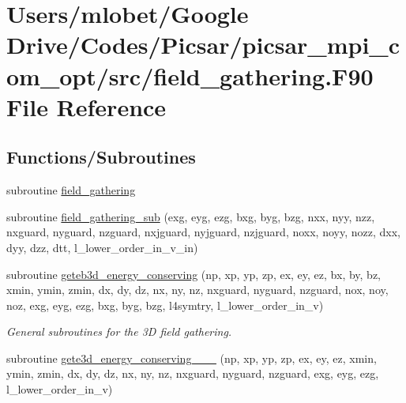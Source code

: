 \hypertarget{field__gathering_8_f90}{}\section{Users/mlobet/\+Google Drive/\+Codes/\+Picsar/picsar\+\_\+mpi\+\_\+com\+\_\+opt/src/field\+\_\+gathering.F90 File Reference}
\label{field__gathering_8_f90}
\subsection*{Functions/\+Subroutines}
\begin{DoxyCompactItemize}
\item 
subroutine \hyperlink{field__gathering_8_f90_a967586c463fd968e31a929a61e6e2b65}{field\+\_\+gathering}
\item 
subroutine \hyperlink{field__gathering_8_f90_a3048fd8eb5e48d87fa67d382d260b22f}{field\+\_\+gathering\+\_\+sub} (exg, eyg, ezg, bxg, byg, bzg, nxx, nyy, nzz, nxguard, nyguard, nzguard, nxjguard, nyjguard, nzjguard, noxx, noyy, nozz, dxx, dyy, dzz, dtt, l\+\_\+lower\+\_\+order\+\_\+in\+\_\+v\+\_\+in)
\item 
subroutine \hyperlink{field__gathering_8_f90_a97c6b6e6c658ab27a94491501be23409}{geteb3d\+\_\+energy\+\_\+conserving} (np, xp, yp, zp, ex, ey, ez, bx, by, bz, xmin, ymin, zmin, dx, dy, dz, nx, ny, nz, nxguard, nyguard, nzguard,                                                                                                                                                       nox, noy, noz, exg, eyg, ezg, bxg, byg, bzg, l4symtry, l\+\_\+lower\+\_\+order\+\_\+in\+\_\+v)
\begin{DoxyCompactList}\small\item\em General subroutines for the 3D field gathering. \end{DoxyCompactList}\item 
subroutine \hyperlink{field__gathering_8_f90_a573c1601d8884aa699121b456d176757}{gete3d\+\_\+energy\+\_\+conserving\+\_\+\_\+\_} (np, xp, yp, zp, ex, ey, ez, xmin, ymin, zmin,                                                                                                                                                           dx, dy, dz, nx, ny, nz, nxguard, nyguard, nzguard,                                                                                                                                                   exg, eyg, ezg, l\+\_\+lower\+\_\+order\+\_\+in\+\_\+v)

\end{DoxyCompactItemize}
